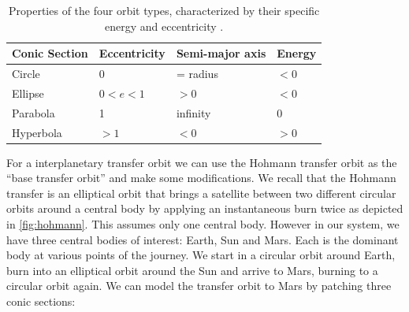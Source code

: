 \begin{table}[tbp]
    \centering
    \begin{tabular}{@{}llll@{}}
    \toprule
    Conic Section & Eccentricity    & Semi-major axis & Energy  \\ \midrule
    Circle        & $0$             & = radius        & $<0$    \\
    Ellipse       & $0 < e < 1$     & $>0$            & $<0$    \\
    Parabola      & 1               & infinity        & $0$     \\
    Hyperbola     & $>1$            & $<0$            & $>0$    \\ \bottomrule
    \end{tabular}
    \caption{Properties of the four orbit types, characterized by their specific energy and eccentricity \cite{Braeunig}.}
    \label{tab:orbit-type-properties}
\end{table}


For a interplanetary transfer orbit we can use the Hohmann transfer orbit as the ``base transfer orbit'' and make some modifications. We recall that the Hohmann transfer is an elliptical orbit that brings a satellite between two different circular orbits around a central body by applying an instantaneous burn twice as depicted in \cref{fig:hohmann}. This assumes only one central body. However in our system, we have three central bodies of interest: Earth, Sun and Mars. Each is the dominant body at various points of the journey. We start in a circular orbit around Earth, burn into an elliptical orbit around the Sun and arrive to Mars, burning to a circular orbit again. We can model the transfer orbit to Mars by patching three conic sections:

